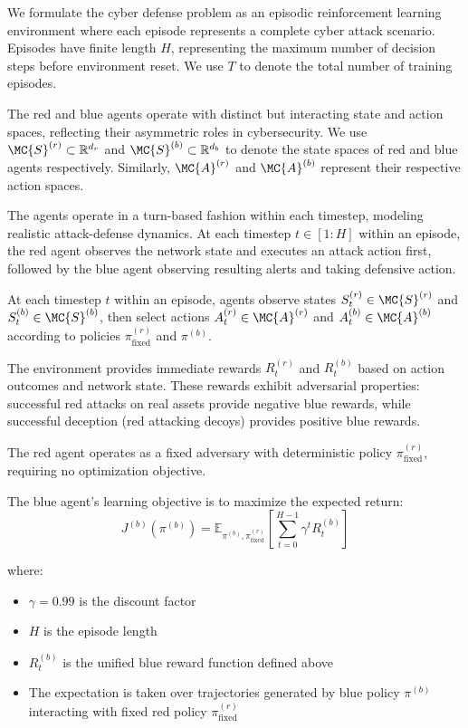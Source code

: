\documentclass[12pt,oneside]{article}
\begin{document}
We formulate the cyber defense problem as an episodic reinforcement learning environment where each episode represents a complete cyber attack scenario. Episodes have finite length $H$, representing the maximum number of decision steps before environment reset. We use $T$ to denote the total number of training episodes.

The red and blue agents operate with distinct but interacting state and action spaces, reflecting their asymmetric roles in cybersecurity. We use $\MC{S}^{(r)} \subset \mathbb{R}^{d_r}$ and $\MC{S}^{(b)} \subset \mathbb{R}^{d_b}$ to denote the state spaces of red and blue agents respectively. Similarly, $\MC{A}^{(r)}$ and $\MC{A}^{(b)}$ represent their respective action spaces.

The agents operate in a turn-based fashion within each timestep, modeling realistic attack-defense dynamics. At each timestep $t \in [1:H]$ within an episode, the red agent observes the network state and executes an attack action first, followed by the blue agent observing resulting alerts and taking defensive action.

At each timestep $t$ within an episode, agents observe states $S_t^{(r)} \in \MC{S}^{(r)}$ and $S_t^{(b)} \in \MC{S}^{(b)}$, then select actions $A_t^{(r)} \in \MC{A}^{(r)}$ and $A_t^{(b)} \in \MC{A}^{(b)}$ according to policies $\pi^{(r)}_{\text{fixed}}$ and $\pi^{(b)}$.

The environment provides immediate rewards $R_t^{(r)}$ and $R_t^{(b)}$ based on action outcomes and network state. These rewards exhibit adversarial properties: successful red attacks on real assets provide negative blue rewards, while successful deception (red attacking decoys) provides positive blue rewards.

The red agent operates as a fixed adversary with deterministic policy $\pi^{(r)}_{\text{fixed}}$, requiring no optimization objective.

The blue agent's learning objective is to maximize the expected return:
\begin{equation}
J^{(b)}(\pi^{(b)}) = \mathbb{E}_{\pi^{(b)}, \pi^{(r)}_{\text{fixed}}}\left[\sum_{t=0}^{H-1} \gamma^t R_t^{(b)}\right]
\end{equation}

where:
\begin{itemize}
\item $\gamma = 0.99$ is the discount factor
\item $H$ is the episode length 
\item $R_t^{(b)}$ is the unified blue reward function defined above
\item The expectation is taken over trajectories generated by blue policy $\pi^{(b)}$ interacting with fixed red policy $\pi^{(r)}_{\text{fixed}}$
\end{itemize}
\end{document}
